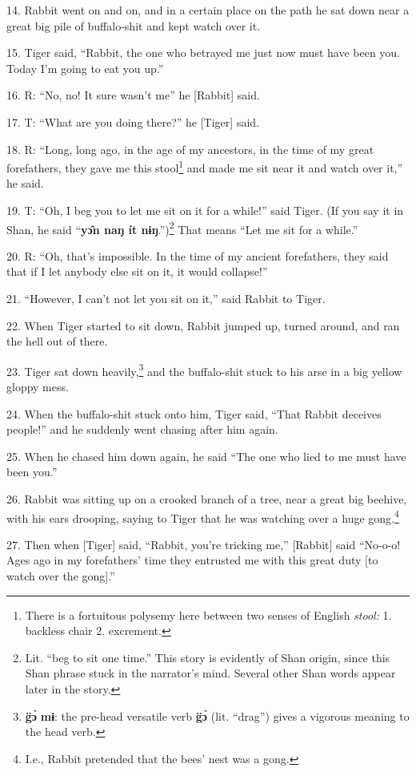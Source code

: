14. Rabbit went on and on, and in a certain place on the path he
sat down near a great big pile of buffalo-shit and kept watch over it.

15. Tiger said, ``Rabbit, the one who betrayed me just now must have been you.
Today I'm going to eat you up.''

16. R: ``No, no! It sure wasn't me'' he [Rabbit] said.

17. T: ``What are you doing there?'' he [Tiger] said.

18. R: ``Long, long ago, in the age of my ancestors, in the time of my
great forefathers, they gave me this stool\footnote{There is a fortuitous polysemy here between two senses of English \textit{stool:} 1. backless chair 2. excrement.} and made me sit near it and watch
over it,'' he said.

19. T: ``Oh, I beg you to let me sit on it for a while!'' said Tiger. (If you say
it in Shan, he said ``\textbf{yɔ̂n naŋ ít nɨŋ}.'')\footnote{Lit. ``beg to sit one time.'' This story is evidently of Shan origin, since this Shan phrase stuck in the narrator's mind. Several other Shan words appear later in the story.} That means ``Let me
sit for a while.''

20. R: ``Oh, that's impossible. In the time of my ancient forefathers, they said
that if I let anybody else sit on it, it would collapse!''

21. ``However, I can't not let you sit on it,'' said Rabbit to Tiger.

22. When Tiger started to sit down, Rabbit jumped up, turned around, and ran the
hell out of there.

23. Tiger sat down heavily,\footnote{\textbf{g̈ɔ̀} \textbf{mɨ}: the pre-head versatile verb \textbf{g̈ɔ̀} (lit. ``drag'') gives a vigorous meaning to the head verb.} and the buffalo-shit stuck to his arse in a big
yellow gloppy mess.

24. When the buffalo-shit stuck onto him, Tiger said, ``That Rabbit deceives people!''
and he suddenly went chasing after him again.

25. When he chased him down again, he said ``The one who lied to me must have been
you.''

26. Rabbit was sitting up on a crooked branch of a tree, near a great big beehive,
with his ears drooping, saying to Tiger that he was watching over a huge gong.\footnote{I.e., Rabbit pretended that the bees' nest was a gong.}

27. Then when [Tiger] said, ``Rabbit, you're tricking me,'' [Rabbit] said ``No-o-o!
Ages ago in my forefathers' time they entrusted me with this great duty [to watch
over the gong].''

